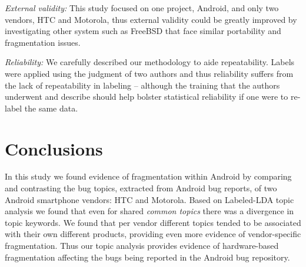 \documentclass[10pt, conference, compsocconf]{IEEEtran}
\begin{document}

\textit{External validity:}  This study focused on one project,
Android, and only two vendors, HTC and Motorola, thus external
validity could be greatly improved by investigating other system such
as FreeBSD that face similar portability and fragmentation issues.

\textit{Reliability:}  
We carefully described our methodology to aide repeatability.
Labels were applied using the judgment of two authors and
thus reliability suffers from the lack of repeatability in labeling --
although the training that the authors
underwent and describe should help bolster statistical reliability if one were to
re-label the same data.


\section{Conclusions}
\label{sec:conclusions}

In this study we found evidence of fragmentation within Android by
comparing and contrasting the bug topics, extracted from  Android bug reports,
of 
two Android smartphone vendors: HTC and Motorola.
Based on Labeled-LDA topic analysis we found that even for shared \emph{common
topics} there was a divergence in topic keywords. We found that per vendor
different topics tended to be associated with their own different
products, providing even more evidence of vendor-specific fragmentation.
Thus our topic analysis provides evidence of hardware-based
fragmentation affecting the bugs being reported in the Android bug
repository.
\end{document}
